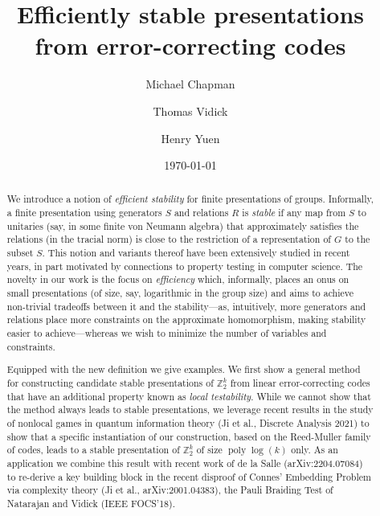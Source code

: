 \documentclass[11pt]{article}
\theoremstyle{definition}
\newcommand{\Z}{\ensuremath{\mathbb{Z}}}
\DeclareMathOperator{\poly}{poly}
\begin{document}
\title{Efficiently stable presentations from error-correcting codes}

\author[1]{Michael Chapman}
\author[2]{Thomas Vidick}
\author[3]{Henry Yuen}
\affil[1]{}
\affil[2]{}
\affil[3]{}

\date{\today}
\maketitle

\noteswarning


\begin{abstract}
We introduce a notion of \emph{efficient stability} for finite presentations of groups. Informally, a finite presentation using generators $S$ and relations $R$ is \emph{stable} if any map from $S$ to unitaries (say, in some finite von Neumann algebra) that approximately satisfies the relations (in the tracial norm) is close to the restriction of a representation of $G$ to the subset $S$. This notion and variants thereof have been extensively studied in recent years, in part motivated by connections to property testing in computer science. The novelty in our work is the focus on \emph{efficiency} which, informally, places an onus on small presentations (of size, say, logarithmic in the group size) and aims to achieve non-trivial tradeoffs between it and the stability---as, intuitively, more generators and relations place more constraints on the approximate homomorphism, making stability easier to achieve---whereas we wish to minimize the number of variables and constraints. 

Equipped with the new definition we give examples. We first show a general method for constructing candidate stable presentations of $\Z_2^k$ from linear error-correcting codes that have an additional property known as \emph{local testability}. While we cannot show that the method always leads to stable presentations, we leverage recent results in the study of nonlocal games in quantum information theory (Ji et al., Discrete Analysis 2021) to show that a specific instantiation of our construction, based on the Reed-Muller family of codes, leads to a stable presentation of $\Z_2^k$ of size $\poly\log(k)$ only. As an application we combine this result with recent work of de la Salle (arXiv:2204.07084) to re-derive a key building block in the recent disproof of Connes' Embedding Problem via complexity theory (Ji et al., arXiv:2001.04383), the Pauli Braiding Test of Natarajan and Vidick (IEEE FOCS'18). 
\end{abstract}
\end{document}

